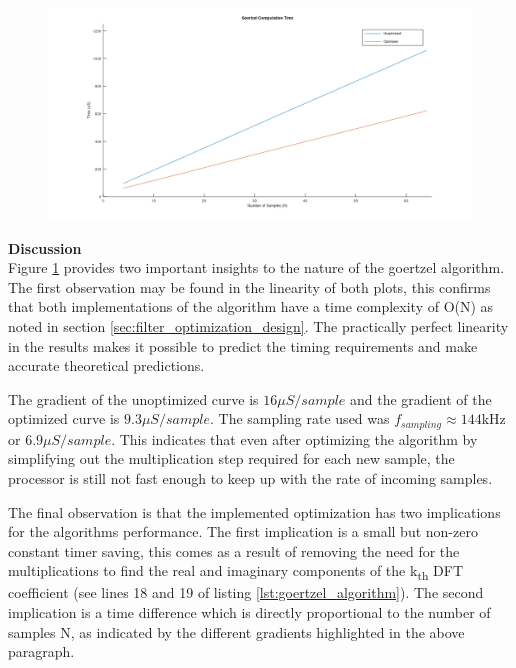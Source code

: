 \begin{figure}[H]
	\centering
	\includegraphics[width=\linewidth]{figures/results/goertzel_filter_speed/goertzel_computation_time.png}
	\label{fig:goertzel_computation_plot}
\end{figure}




\textbf{Discussion}\\
Figure \ref{fig:goertzel_computation_plot} provides two important insights to the nature of the goertzel algorithm. The first observation may be found in the linearity of both plots, this confirms that both implementations of the algorithm have a time complexity of O(N) as noted in section \ref{sec:filter_optimization_design}. The practically perfect linearity in the results makes it possible to predict the timing requirements and make accurate theoretical predictions.

The gradient of the unoptimized curve is $16\mu S/sample$ and the gradient of the optimized curve is $9.3\mu S/sample$. The sampling rate used was $f_{sampling} \approx 144$kHz or $6.9\mu S/sample$. This indicates that even after optimizing the algorithm by simplifying out the multiplication step required for each new sample, the processor is still not fast enough to keep up with the rate of incoming samples.

The final observation is that the implemented optimization has two implications for the algorithms performance. The first implication is a small but non-zero constant timer saving, this comes as a result of removing the need for the multiplications to find the real and imaginary components of the k\textsubscript{th} DFT coefficient (see lines 18 and 19 of listing \ref{lst:goertzel_algorithm}). The second implication is a time difference which is directly proportional to the number of samples N, as indicated by the different gradients highlighted in the above paragraph.


